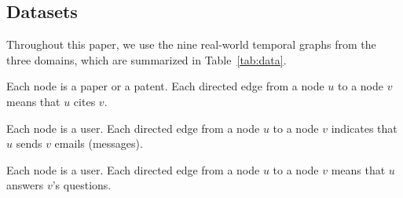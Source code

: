 \subsection{Datasets}\label{section:datasets}
Throughout this paper, we use the nine real-world temporal graphs from the three domains, which are summarized in Table~\ref{tab:data}. 

Each node is a paper or a patent. Each directed edge from a node $u$ to a node $v$ means that $u$ cites $v$. 

Each node is a user. Each directed edge from a node $u$ to a node $v$ indicates that $u$ sends $v$ emails (messages). 

Each node is a user. Each directed edge from a node $u$ to a node $v$ means that $u$ answers $v$'s questions.